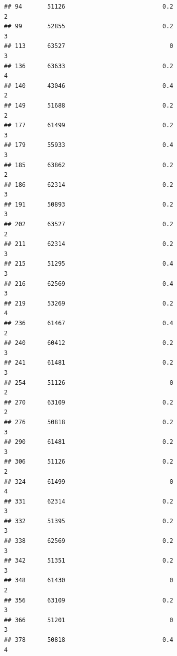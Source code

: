 \documentclass[
]{article}
\begin{document}
\begin{verbatim}
## 94       51126                           0.2                              2
## 99       52855                           0.2                              3
## 113      63527                             0                              3
## 136      63633                           0.2                              4
## 140      43046                           0.4                              2
## 149      51688                           0.2                              2
## 177      61499                           0.2                              3
## 179      55933                           0.4                              3
## 185      63862                           0.2                              2
## 186      62314                           0.2                              3
## 191      50893                           0.2                              3
## 202      63527                           0.2                              2
## 211      62314                           0.2                              3
## 215      51295                           0.4                              3
## 216      62569                           0.4                              3
## 219      53269                           0.2                              4
## 236      61467                           0.4                              2
## 240      60412                           0.2                              3
## 241      61481                           0.2                              3
## 254      51126                             0                              2
## 270      63109                           0.2                              2
## 276      50818                           0.2                              3
## 290      61481                           0.2                              3
## 306      51126                           0.2                              2
## 324      61499                             0                              4
## 331      62314                           0.2                              3
## 332      51395                           0.2                              3
## 338      62569                           0.2                              3
## 342      51351                           0.2                              3
## 348      61430                             0                              2
## 356      63109                           0.2                              3
## 366      51201                             0                              3
## 378      50818                           0.4                              4

\end{verbatim}
\end{document}
